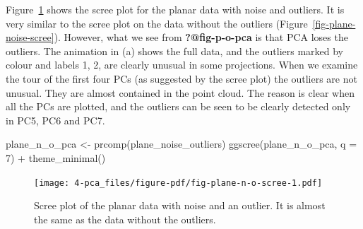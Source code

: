 \documentclass[
  letterpaper,
]{krantz}
\newenvironment{Shaded}{\begin{snugshade}}{\end{snugshade}}
\newcommand{\AttributeTok}[1]{\textcolor[rgb]{0.40,0.45,0.13}{#1}}
\newcommand{\DecValTok}[1]{\textcolor[rgb]{0.68,0.00,0.00}{#1}}
\newcommand{\FunctionTok}[1]{\textcolor[rgb]{0.28,0.35,0.67}{#1}}
\newcommand{\NormalTok}[1]{\textcolor[rgb]{0.00,0.23,0.31}{#1}}
\newcommand{\OtherTok}[1]{\textcolor[rgb]{0.00,0.23,0.31}{#1}}
\newcommand{\SpecialCharTok}[1]{\textcolor[rgb]{0.37,0.37,0.37}{#1}}
\begin{document}
Figure~\ref{fig-plane-n-o-scree} shows the scree plot for the planar
data with noise and outliers. It is very similar to the scree plot on
the data without the outliers (Figure~\ref{fig-plane-noise-scree}).
However, what we see from \textbf{?@fig-p-o-pca} is that PCA loses the
outliers. The animation in (a) shows the full data, and the outliers
marked by colour and labels 1, 2, are clearly unusual in some
projections. When we examine the tour of the first four PCs (as
suggested by the scree plot) the outliers are not unusual. They are
almost contained in the point cloud. The reason is clear when all the
PCs are plotted, and the outliers can be seen to be clearly detected
only in PC5, PC6 and PC7.

\begin{Shaded}
\begin{Highlighting}[]
\NormalTok{plane\_n\_o\_pca }\OtherTok{\textless{}{-}} \FunctionTok{prcomp}\NormalTok{(plane\_noise\_outliers)}
\FunctionTok{ggscree}\NormalTok{(plane\_n\_o\_pca, }\AttributeTok{q =} \DecValTok{7}\NormalTok{) }\SpecialCharTok{+} \FunctionTok{theme\_minimal}\NormalTok{()}
\end{Highlighting}
\end{Shaded}

\begin{figure}[H]

{\centering \texttt{[image: 4-pca\_files/figure-pdf/fig-plane-n-o-scree-1.pdf]}

}

\caption{\label{fig-plane-n-o-scree}Scree plot of the planar data with
noise and an outlier. It is almost the same as the data without the
outliers.}

\end{figure}
\end{document}
